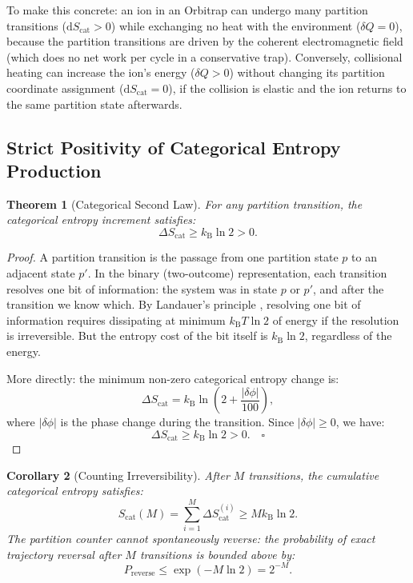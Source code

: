 \documentclass[twocolumn,10pt]{article}
\newtheorem{theorem}{Theorem}[section]
\newtheorem{corollary}[theorem]{Corollary}
\newcommand{\kB}{k_{\mathrm{B}}}
\newcommand{\Scat}{S_{\mathrm{cat}}}
\newcommand{\dQ}{\delta Q}
\newcommand{\dS}{\mathrm{d}S}
\begin{document}
To make this concrete: an ion in an Orbitrap can undergo many partition transitions ($\dS_{\mathrm{cat}} > 0$) while exchanging no heat with the environment ($\dQ = 0$), because the partition transitions are driven by the coherent electromagnetic field (which does no net work per cycle in a conservative trap). Conversely, collisional heating can increase the ion's energy ($\dQ > 0$) without changing its partition coordinate assignment ($\dS_{\mathrm{cat}} = 0$), if the collision is elastic and the ion returns to the same partition state afterwards.

\subsection{Strict Positivity of Categorical Entropy Production}

\begin{theorem}[Categorical Second Law]
\label{thm:secondlaw}
For any partition transition, the categorical entropy increment satisfies:
\begin{equation}
    \Delta \Scat \geq \kB \ln 2 > 0.
    \label{eq:secondlaw}
\end{equation}
\end{theorem}

\begin{proof}
A partition transition is the passage from one partition state $p$ to an adjacent state $p'$. In the binary (two-outcome) representation, each transition resolves one bit of information: the system was in state $p$ or $p'$, and after the transition we know which. By Landauer's principle \citep{landauer1961}, resolving one bit of information requires dissipating at minimum $\kB T \ln 2$ of energy if the resolution is irreversible. But the entropy cost of the bit itself is $\kB \ln 2$, regardless of the energy.

More directly: the minimum non-zero categorical entropy change is:
\begin{equation}
    \Delta \Scat = \kB \ln\left(2 + \frac{|\delta\phi|}{100}\right),
    \label{eq:entropy_formula}
\end{equation}
where $|\delta\phi|$ is the phase change during the transition. Since $|\delta\phi| \geq 0$, we have:
\begin{equation}
    \Delta \Scat \geq \kB \ln 2 > 0. \quad \square
\end{equation}
\end{proof}

\begin{corollary}[Counting Irreversibility]
After $M$ transitions, the cumulative categorical entropy satisfies:
\begin{equation}
    \Scat(M) = \sum_{i=1}^{M} \Delta \Scat^{(i)} \geq M \kB \ln 2.
\end{equation}
The partition counter cannot spontaneously reverse: the probability of exact trajectory reversal after $M$ transitions is bounded above by:
\begin{equation}
    P_{\mathrm{reverse}} \leq \exp(-M \ln 2) = 2^{-M}.
\end{equation}
\end{corollary}
\end{document}
